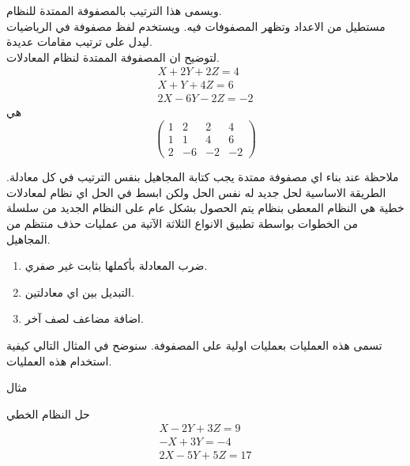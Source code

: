 	\begin{frame}
		\begin{exampleblock}{}
			
			ويسمى هذا الترتيب بالمصفوفة الممتدة للنظام.\\
			مستطيل من الاعداد وتظهر المصفوفات فيه. ويستخدم لفظ مصفوفة في الرياضيات ليدل على ترتيب مقامات عديدة.\\
			\noindent
			لتوضيح ان المصفوفة الممتدة لنظام المعادلات.
			\begin{gather*}
				X + 2Y + 2Z = 4\\
				X+Y +4Z = 6\\
				2X - 6Y - 2Z =-2
			\end{gather*}
			هي
			\[
			\left(
			\begin{array}{ccc|c}
				1&2&2&4\\
				1&1&4&6\\
				2 &-6& -2& -2
			\end{array}
			\right)
			\]
		\end{exampleblock}
	\end{frame}
	
	\begin{frame}
		\begin{exampleblock}{ملاحظة}
			 	عند بناء اي مصفوفة ممتدة يجب كتابة المجاهيل بنفس الترتيب في كل معادلة.
			الطريقة الاساسية لحل جديد له نفس الحل ولكن ابسط في الحل اي نظام لمعادلات خطية هي النظام المعطى بنظام يتم الحصول بشكل عام على النظام الجديد من سلسلة من الخطوات بواسطة تطبيق الانواع الثلاثة الآتية من عمليات حذف منتظم من المجاهيل.
			\begin{enumerate}
				\item ضرب المعادلة بأكملها بثابت غير صفري.
				\item التبديل بين  اي معادلتين.
				\item اضافة مضاعف لصف آخر.
			\end{enumerate}  
			تسمى هذه العمليات بعمليات اولية على المصفوفة. سنوضح في المثال التالي كيفية استخدام هذه العمليات.
		\end{exampleblock}
		
		\begin{exampleblock}{مثال}
			
			حل النظام الخطي
			\begin{gather*}
				X-2Y + 3Z=9\\
				-X +3Y =-4\\
				2X-5Y+5Z=17
			\end{gather*}
		\end{exampleblock}
	\end{frame}
	
